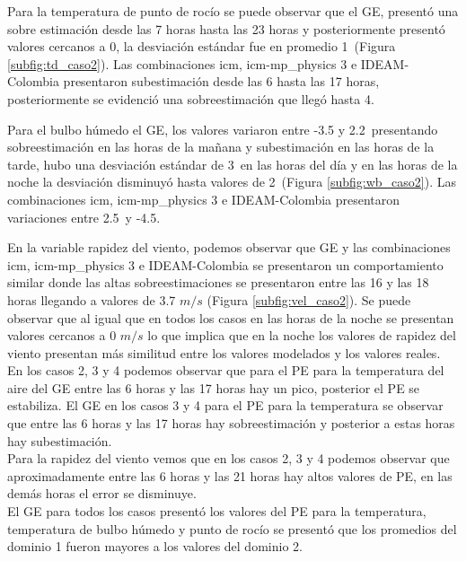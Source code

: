 Para la temperatura de punto de rocío se puede observar que el GE, presentó una sobre estimación desde las 7 horas hasta las 23 horas y posteriormente presentó valores cercanos a 0\celc, la desviación estándar fue en promedio 1\celc\ (Figura \ref{subfig:td_caso2}). Las combinaciones icm, icm-mp\_physics 3 e IDEAM-Colombia presentaron subestimación desde las 6 hasta las 17 horas, posteriormente se evidenció una sobreestimación que llegó hasta 4\celsius. 

Para el bulbo húmedo el GE, los valores variaron entre -3.5 y 2.2\celc\ presentando sobreestimación en las horas de la mañana y subestimación en las horas de la tarde, hubo una desviación estándar de 3\celsius\ en las horas del día y en las horas de la noche la desviación disminuyó hasta valores de 2\celc\ (Figura \ref{subfig:wb_caso2}). Las combinaciones icm, icm-mp\_physics 3 e IDEAM-Colombia presentaron variaciones entre 2.5\celc\ y -4.5\celc. 

En la variable rapidez del viento, podemos observar que GE y las combinaciones icm, icm-mp\_physics 3 e IDEAM-Colombia se presentaron un comportamiento similar donde las altas sobreestimaciones se presentaron entre las 16 y las 18 horas llegando a valores de 3.7 $m/s$ (Figura \ref{subfig:vel_caso2}). Se puede observar que al igual que en todos los casos en las horas de la noche se presentan valores cercanos a 0 $m/s$ lo que implica que en la noche los valores de rapidez del viento presentan más similitud entre los valores modelados y los valores reales.\\

En los casos 2, 3 y 4 podemos observar que para el PE para la temperatura del aire del GE entre las 6 horas y las 17 horas hay un pico, posterior el PE se estabiliza. El GE en los casos 3 y 4 para el PE para la temperatura se observar que entre las 6 horas y las 17 horas hay sobreestimación y posterior a estas horas hay subestimación.\\

Para la rapidez del viento vemos que en los casos 2, 3 y 4 podemos observar que aproximadamente entre las 6 horas y las 21 horas hay altos valores de PE, en las demás horas el error se disminuye.\\

El GE para todos los casos presentó los valores del PE para la temperatura, temperatura de bulbo húmedo y punto de rocío se presentó que los promedios del dominio 1 fueron mayores a los valores del dominio 2.\\

